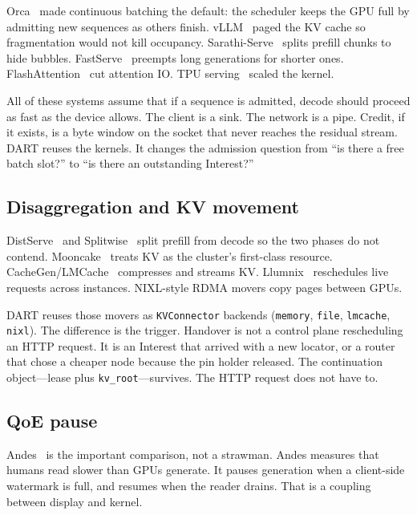 \documentclass{article}
\theoremstyle{definition}
\newcommand{\kvroot}{\texttt{kv\_root}}
\begin{document}
Orca~\citep{yu2022orca} made continuous batching the default: the scheduler keeps the GPU full by admitting new sequences as others finish.
vLLM~\citep{kwon2023vllm} paged the KV cache so fragmentation would not kill occupancy.
Sarathi-Serve~\citep{agrawal2024sarathi} splits prefill chunks to hide bubbles.
FastServe~\citep{hao2024fastserve} preempts long generations for shorter ones.
FlashAttention~\citep{dao2022flashattention} cut attention IO.
TPU serving~\citep{pope2023efficiently} scaled the kernel.

All of these systems assume that if a sequence is admitted, decode should proceed as fast as the device allows.
The client is a sink.
The network is a pipe.
Credit, if it exists, is a byte window on the socket that never reaches the residual stream.
DART reuses the kernels.
It changes the admission question from ``is there a free batch slot?'' to ``is there an outstanding Interest?''

\subsection{Disaggregation and KV movement}

DistServe~\citep{zhong2024distserve} and Splitwise~\citep{patel2024splitwise} split prefill from decode so the two phases do not contend.
Mooncake~\citep{qin2024mooncake} treats KV as the cluster's first-class resource.
CacheGen/LMCache~\citep{lmcache2024} compresses and streams KV.
Llumnix~\citep{sun2024llumnix} reschedules live requests across instances.
NIXL-style RDMA movers copy pages between GPUs.

DART reuses those movers as \texttt{KVConnector} backends (\texttt{memory}, \texttt{file}, \texttt{lmcache}, \texttt{nixl}).
The difference is the trigger.
Handover is not a control plane rescheduling an HTTP request.
It is an Interest that arrived with a new locator, or a router that chose a cheaper node because the pin holder released.
The continuation object---lease plus \kvroot{}---survives.
The HTTP request does not have to.

\subsection{QoE pause}

Andes~\citep{liu2024andes} is the important comparison, not a strawman.
Andes measures that humans read slower than GPUs generate.
It pauses generation when a client-side watermark is full, and resumes when the reader drains.
That is a coupling between display and kernel.
\end{document}
